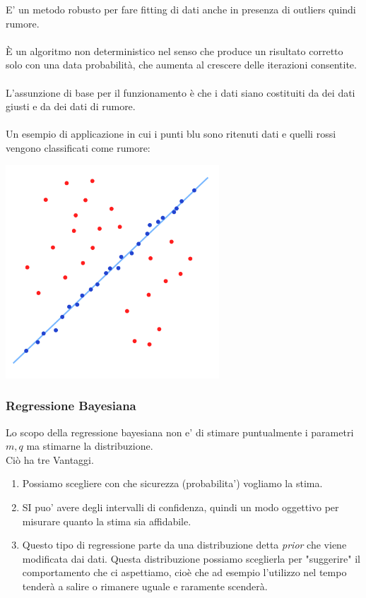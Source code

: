 \documentclass{article}
\begin{document}
E' un metodo robusto per fare fitting di dati anche in presenza di outliers quindi rumore.
\\\\
 È un algoritmo non deterministico nel senso che produce un risultato corretto solo con una data probabilità, che aumenta al crescere delle iterazioni consentite.\\\\
 L'assunzione di base per il funzionamento è che i dati siano costituiti da dei dati giusti e da dei dati di rumore.\\\\
 Un esempio di applicazione in cui i punti blu sono ritenuti dati e quelli rossi vengono classificati come rumore:
\begin{center}
\includegraphics[width=8cm]{imgs/RANSAC.png}
\end{center}    

\subsubsection{Regressione Bayesiana}

Lo scopo della regressione bayesiana non e' di stimare puntualmente i parametri \(m, q\) ma stimarne la distribuzione.\\

Ciò ha tre  Vantaggi.\\

\begin{enumerate}
    \item Possiamo scegliere con che sicurezza (probabilita') vogliamo la stima.
    \item SI puo' avere degli intervalli di confidenza, quindi un modo oggettivo per misurare quanto la stima sia affidabile.
    \item Questo tipo di regressione parte da una distribuzione detta \textit{prior} che viene modificata dai dati.
        Questa distribuzione possiamo sceglierla per "suggerire" il comportamento che ci aspettiamo, cioè che ad esempio l'utilizzo nel tempo tenderà a salire o rimanere uguale e raramente scenderà.
    
\end{enumerate}
\end{document}
